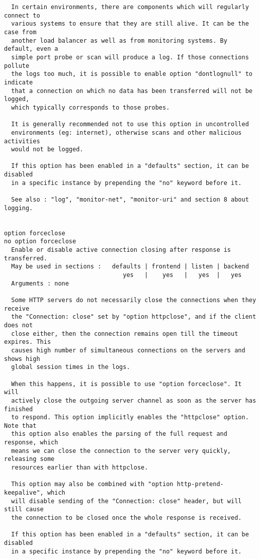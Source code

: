 \begin{verbatim}
  In certain environments, there are components which will regularly connect to
  various systems to ensure that they are still alive. It can be the case from
  another load balancer as well as from monitoring systems. By default, even a
  simple port probe or scan will produce a log. If those connections pollute
  the logs too much, it is possible to enable option "dontlognull" to indicate
  that a connection on which no data has been transferred will not be logged,
  which typically corresponds to those probes.

  It is generally recommended not to use this option in uncontrolled
  environments (eg: internet), otherwise scans and other malicious activities
  would not be logged.

  If this option has been enabled in a "defaults" section, it can be disabled
  in a specific instance by prepending the "no" keyword before it.

  See also : "log", "monitor-net", "monitor-uri" and section 8 about logging.


option forceclose
no option forceclose
  Enable or disable active connection closing after response is transferred.
  May be used in sections :   defaults | frontend | listen | backend
                                 yes   |    yes   |   yes  |   yes
  Arguments : none

  Some HTTP servers do not necessarily close the connections when they receive
  the "Connection: close" set by "option httpclose", and if the client does not
  close either, then the connection remains open till the timeout expires. This
  causes high number of simultaneous connections on the servers and shows high
  global session times in the logs.

  When this happens, it is possible to use "option forceclose". It will
  actively close the outgoing server channel as soon as the server has finished
  to respond. This option implicitly enables the "httpclose" option. Note that
  this option also enables the parsing of the full request and response, which
  means we can close the connection to the server very quickly, releasing some
  resources earlier than with httpclose.

  This option may also be combined with "option http-pretend-keepalive", which
  will disable sending of the "Connection: close" header, but will still cause
  the connection to be closed once the whole response is received.

  If this option has been enabled in a "defaults" section, it can be disabled
  in a specific instance by prepending the "no" keyword before it.


\end{verbatim}
